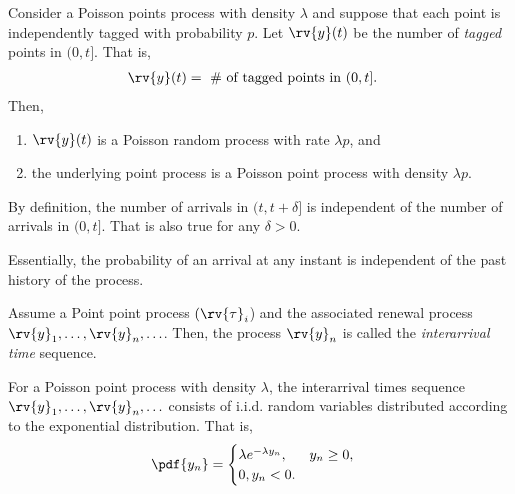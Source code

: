 \begin{theoremBox}
     Consider a Poisson points process with density $\lambda$ and suppose that each point is independently tagged with probability $p$. Let $\rv{y}(t)$ be the number of \emph{tagged}  points in $(0, t]$. That is,
     \begin{align}
         \rv{y}(t) &= \text{ \# of tagged points in } (0, t].
     \end{align}
     Then,
     \begin{enumerate}
         \item $\rv{y}(t)$ is a Poisson random process with rate $\lambda p$, and
         \item the underlying point process is a Poisson point process with density $\lambda p$. 
     \end{enumerate}
\end{theoremBox}

\begin{property}
    By definition, the number of arrivals in $(t, t+\delta]$ is independent of the number of arrivals in $(0, t]$. That is also true for any $\delta >0$.

    Essentially, the probability of an arrival at any instant is independent of the past history of the process.
\end{property}

\begin{definitionBox}
    Assume a Point point process $(\rv{\tau}_{i}$) and the associated renewal process $\rv{y}_{1}, \ldots, \rv{y}_{n},\ldots$. Then, the process $\rv{y}_{n}$ is called the \emph{interarrival time} sequence.
\end{definitionBox}

\begin{theoremBox}
     For a Poisson point process with density $\lambda$, the interarrival times sequence $\rv{y}_{1},\ldots, \rv{y}_{n},\ldots$ consists of i.i.d. random variables distributed according to the exponential distribution. That is,
     \begin{align}
         \pdf{y_{n}} &= 
         \begin{cases}
            \lambda e^{-\lambda y_{n}}, & y_{n}\geq 0,\\
            0, y_{n}<0.
        \end{cases}
     \end{align}
\end{theoremBox}


